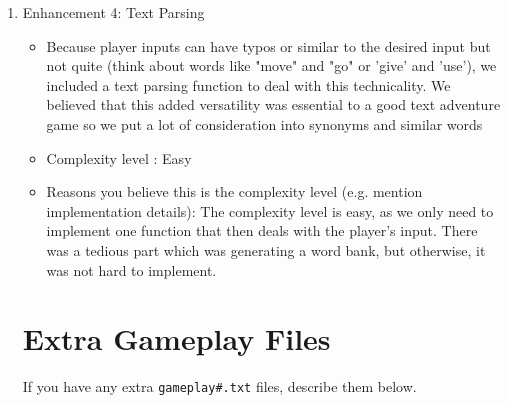 \documentclass[11pt]{article}
\begin{document}
\begin{enumerate}
\begin{itemize}
\end{itemize}

\item Enhancement 4: Text Parsing
    \begin{itemize}
    \item Because player inputs can have typos or similar to the desired input but not quite (think about words like "move" and "go" or 'give' and 'use'), we included a text parsing function to deal with this technicality. We believed that this added versatility was essential to a good text adventure game so we put a lot of consideration into synonyms and similar words

    \item Complexity level : Easy
    \item Reasons you believe this is the complexity level (e.g. mention implementation details):
    The complexity level is easy, as we only need to implement one function that then deals with the player's input. There was a tedious part which was generating a word bank, but otherwise, it was not hard to implement.
\end{itemize}

\section*{Extra Gameplay Files}

If you have any extra \texttt{gameplay\#.txt} files, describe them below.

\end{enumerate}
\end{document}
